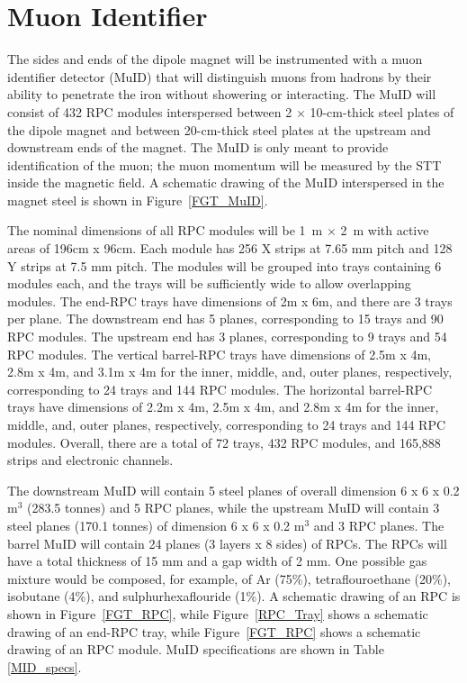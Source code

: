 \section{Muon Identifier}
\label{sec:muid}

The sides and ends of the dipole magnet will be instrumented
with a muon identifier
detector (MuID) that will distinguish muons from hadrons by their ability 
to penetrate the iron without showering or interacting.
The MuID will consist of 432 RPC modules
interspersed between 2 $\times$ 10-cm-thick steel plates of the 
dipole magnet and between 20-cm-thick steel plates at the upstream and
downstream ends of the magnet. 
The MuID is only meant to provide %
identification of the 
muon; the muon momentum %
will be measured by the STT inside the 
magnetic field. A schematic drawing of the MuID 
interspersed in the magnet steel is shown in Figure~\ref{FGT_MuID}.

The nominal dimensions of all RPC modules will be 1~m $\times$ 2~m with
active areas of 196cm x 96cm. Each
module has 256 X strips
at 7.65 mm pitch and 128 Y strips at 7.5 mm pitch. The modules
will be grouped into trays containing 6 modules each, and the trays will
be sufficiently wide to allow overlapping modules. 
The end-RPC trays have dimensions of 2m x 6m, and there are 3 trays per plane.
The downstream end has 5 planes, corresponding to 15 trays and 90 RPC modules.
The upstream end has 3 planes, corresponding to 9 trays and 54 RPC modules.
The vertical barrel-RPC trays have dimensions of 2.5m x 4m, 2.8m x 4m, and
3.1m x 4m for the inner, middle, and, outer planes, respectively, corresponding
to 24 trays and 144 RPC modules. The horizontal
barrel-RPC trays have dimensions of 2.2m x 4m, 2.5m x 4m, and
2.8m x 4m for the inner, middle, and, outer planes, respectively, 
corresponding to 24 trays and 144 RPC modules. Overall, there are a total of
72 trays, 432 RPC modules, and 165,888 strips and electronic channels. 

The downstream MuID will contain 5 steel planes of 
overall dimension
6 x 6 x 0.2 m$^3$ (283.5 tonnes)
and 5 RPC planes, while the upstream MuID will contain 3 steel
planes (170.1 tonnes) of dimension 6 x 6 x 0.2 m$^3$ and 3 RPC planes. The barrel MuID will contain
24 planes (3 layers x 8 sides) of RPCs. The RPCs will have a total thickness 
of 15 mm and a gap width of 2 mm. One possible gas mixture would be composed, for example,
of Ar (75\%), tetraflouroethane (20\%), isobutane (4\%),
and sulphurhexaflouride (1\%). 
A schematic drawing of an RPC is shown in Figure~\ref{FGT_RPC}, while
Figure~\ref{RPC_Tray} shows a schematic drawing of an end-RPC tray,
while Figure~\ref{FGT_RPC} shows a schematic drawing of an RPC module.
MuID specifications are shown in Table \ref{MID_specs}.

